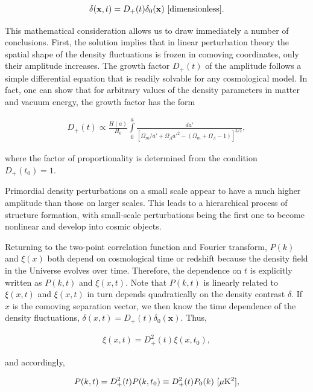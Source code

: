 \documentclass[a4paper,11pt]{article}
\begin{document}
\begin{align*}
    \delta(\mathbf{x},t) = D_+(t)\delta_0(\mathbf{x}) ~ [{\rm dimensionless}].
\end{align*}

{\noindent}This mathematical consideration allows us to draw immediately a number of conclusions. First, the solution implies that in linear perturbation theory the spatial shape of the density fluctuations is frozen in comoving coordinates, only their amplitude increases. The growth factor $D_+(t)$ of the amplitude follows a simple differential equation that is readily solvable for any cosmological model. In fact, one can show that for arbitrary values of the density parameters in matter and vacuum energy, the growth factor has the form

\begin{align*}
    D_+(t) \propto \frac{H(a)}{H_0}\int\limits_0^a \frac{da'}{[\Omega_m/a'+\Omega_\Lambda a'^2-(\Omega_m+\Omega_\Lambda-1)]^{3/2}},
\end{align*}

{\noindent}where the factor of proportionality is determined from the condition $D_+(t_0)=1$.

{\noindent}Primordial density perturbations on a small scale appear to have a much higher amplitude than those on larger scales. This leads to a hierarchical process of structure formation, with small-scale perturbations being the first one to become nonlinear and develop into cosmic objects.

{\noindent}Returning to the two-point correlation function and Fourier transform, $P(k)$ and $\xi(x)$ both depend on cosmological time or redshift because the density field in the Universe evolves over time. Therefore, the dependence on $t$ is explicitly written as $P(k,t)$ and $\xi(x,t)$. Note that $P(k,t)$ is linearly related to $\xi(x,t)$ and $\xi(x,t)$ in turn depends quadratically on the density contrast $\delta$. If $x$ is the comoving separation vector, we then know the time dependence of the density fluctuations, $\delta(x,t)=D_+(t)\delta_0(\mathbf{x})$. Thus,

\begin{align*}
    \xi(x,t) = D_+^2(t)\xi(x,t_0),
\end{align*}

{\noindent}and accordingly,

\begin{align*}
    P(k,t) = D_+^2(t)P(k,t_0) \equiv D_+^2(t)P_0(k)  ~ [{\rm \mu K^2}],
\end{align*}
\end{document}
